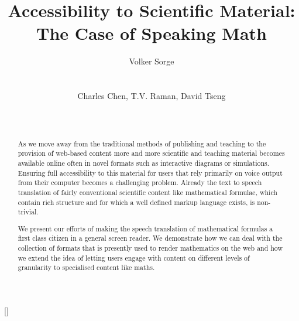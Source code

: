 \documentclass{sig-alternate}
\begin{document}
\title{Accessibility to Scientific Material: The Case of Speaking Math}

\author{
%
%
\alignauthor
Volker Sorge\\
       \\
       \\
\alignauthor
Charles Chen, T.V. Raman, David Tseng\\
       \\
       \\
}


\maketitle
\begin{abstract}
As we move away from the traditional methods of publishing and teaching to the
provision of web-based content more and more scientific and teaching material
becomes available online often in novel formats such as interactive diagrams or
simulations. Ensuring full accessibility to this material for users that rely
primarily on voice output from their computer becomes a challenging
problem. Already the text to speech translation of fairly conventional
scientific content like mathematical formulae, which contain rich structure and
for which a well defined markup language exists, is non-trivial.

We present our efforts of making the speech translation of
mathematical formulas a first class citizen in a general screen
reader. We demonstrate how we can deal with the collection of formats
that is presently used to render mathematics on the web and how we
extend the idea of letting users engage with content on different
levels of granularity to specialised content like maths.
\end{abstract}
\category{}{}{}
\category{}{}{}[]
\end{document}
